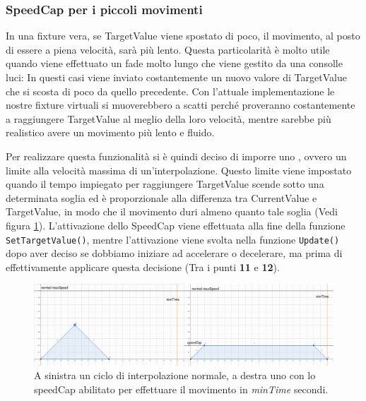 \documentclass[main.tex]{subfiles}
\begin{document}
\subsubsection{SpeedCap per i piccoli movimenti}\label{subsubsec:4_2_Speedcap}
In una fixture vera, se TargetValue viene spostato di poco, il movimento, al posto di essere a piena velocità, sarà più lento. Questa particolarità è molto utile quando viene effettuato un fade molto lungo che viene gestito da una consolle luci: In questi casi viene inviato costantemente un nuovo valore di TargetValue che si scosta di poco da quello precedente. Con l'attuale implementazione le nostre fixture virtuali si muoverebbero a scatti perché proveranno costantemente a raggiungere TargetValue al meglio della loro velocità, mentre sarebbe più realistico avere un movimento più lento e fluido. 

Per realizzare questa funzionalità si è quindi deciso di imporre uno , ovvero un limite alla velocità massima di un'interpolazione. Questo limite viene impostato quando il tempo impiegato per raggiungere TargetValue scende sotto una determinata soglia ed è proporzionale alla differenza tra CurrentValue e TargetValue, in modo che il movimento duri almeno quanto tale soglia (Vedi figura \ref{fig:4_speedCapIntro}). L'attivazione dello SpeedCap viene effettuata alla fine della funzione \lstinline{SetTargetValue()}, mentre l'attivazione viene svolta nella funzione \lstinline{Update()} dopo aver deciso se dobbiamo iniziare ad accelerare o decelerare, ma prima di effettivamente applicare questa decisione (Tra i punti \textbf{11} e \textbf{12}). \newline
\begin{figure}[H]
    \centering
    \includegraphics[width=1\linewidth]{img/interpolazione/speedCapIntro.png}
    \caption{A sinistra un ciclo di interpolazione normale, a destra uno con lo speedCap abilitato per effettuare il movimento in \textit{minTime} secondi.}
    \label{fig:4_speedCapIntro}
\end{figure}
\end{document}
